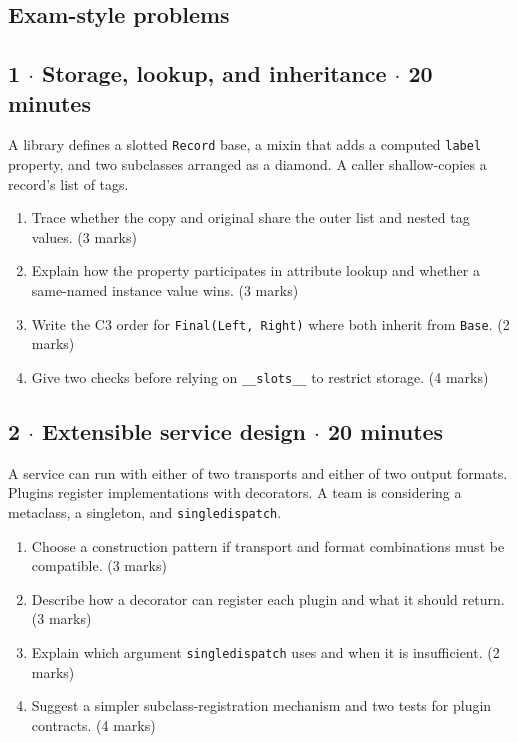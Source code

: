 \documentclass[11pt]{article}
\begin{document}
\begin{keepsection}
\section{Exam-style problems}

\begin{keepsection}
\subsection{1 \ensuremath{\cdot} Storage, lookup, and inheritance \ensuremath{\cdot} 20 minutes}

A library defines a slotted \texttt{Record} base, a mixin that adds a computed \texttt{label} property, and two subclasses arranged as a diamond. A caller shallow-copies a record’s list of tags.

\begin{enumerate}
\item Trace whether the copy and original share the outer list and nested tag values. (3 marks)
\item Explain how the property participates in attribute lookup and whether a same-named instance value wins. (3 marks)
\item Write the C3 order for \texttt{Final(Left, Right)} where both inherit from \texttt{Base}. (2 marks)
\item Give two checks before relying on \texttt{\_\_slots\_\_} to restrict storage. (4 marks)
\end{enumerate}

\end{keepsection}

\begin{keepsection}
\subsection{2 \ensuremath{\cdot} Extensible service design \ensuremath{\cdot} 20 minutes}

A service can run with either of two transports and either of two output formats. Plugins register implementations with decorators. A team is considering a metaclass, a singleton, and \texttt{singledispatch}.

\begin{enumerate}
\item Choose a construction pattern if transport and format combinations must be compatible. (3 marks)
\item Describe how a decorator can register each plugin and what it should return. (3 marks)
\item Explain which argument \texttt{singledispatch} uses and when it is insufficient. (2 marks)
\item Suggest a simpler subclass-registration mechanism and two tests for plugin contracts. (4 marks)
\end{enumerate}


\end{keepsection}
\end{keepsection}
\end{document}
